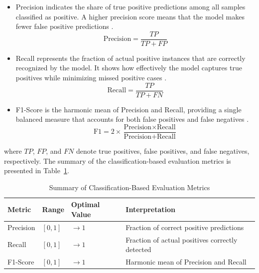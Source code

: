 \documentclass[final, 9pt, twocolumn]{saucis}
\begin{document}
\begin{itemize}
    \item Precision indicates the share of true positive predictions among all samples classified as positive. A higher precision score means that the model makes fewer false positive predictions \cite{method20}.
    \begin{equation}
        \text{Precision} = \frac{TP}{TP + FP}
    \end{equation}

    \item Recall represents the fraction of actual positive instances that are correctly recognized by the model. It shows how effectively the model captures true positives while minimizing missed positive cases \cite{method20}.
    \begin{equation}
        \text{Recall} = \frac{TP}{TP + FN}
    \end{equation}

    \item F1-Score is the harmonic mean of Precision and 
    Recall, providing a single balanced measure that accounts for 
    both false positives and false negatives \cite{method20}.
    \begin{equation}
        \text{F1} = 2 \times \frac{\text{Precision} \times \text{Recall}}
        {\text{Precision} + \text{Recall}}
    \end{equation}
\end{itemize}

where $TP$, $FP$, and $FN$ denote true positives, false positives, and false negatives, respectively. The summary of the classification-based evaluation metrics is presented in Table~\ref{tab:cls_metrics_summary}.

\begin{table}[htbp]
\centering
\caption{Summary of Classification-Based Evaluation Metrics}
\label{tab:cls_metrics_summary}
\small
\begin{tabular}{p{0.9cm} p{1.0cm} p{1cm} p{4.3cm}}
\hline
Metric & Range & Optimal Value & Interpretation \\
\hline
Precision & $[0, 1]$ & $\rightarrow 1$ & Fraction of correct positive predictions \\
Recall    & $[0, 1]$ & $\rightarrow 1$ & Fraction of actual positives correctly detected \\
F1-Score  & $[0, 1]$ & $\rightarrow 1$ & Harmonic mean of Precision and Recall \\
\hline
\end{tabular}
\end{table}
\end{document}
